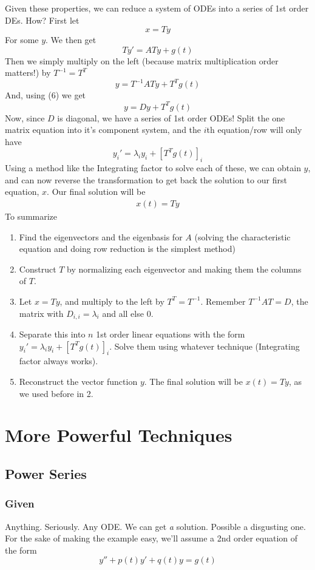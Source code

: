 \documentclass[11pt]{article}
\begin{document}
Given these properties, we can reduce a system of ODEs into a series of 1st order DEs. How? First
let 
    \[ x = Ty \] 
For some $y$. We then get
    \[ Ty' = ATy + g(t) \]
Then we simply multiply on the left (because matrix multiplication order matters!) by $T^{-1} = T^T$
    \[ y = T^{-1}ATy + T^{T}g(t) \]
And, using (6) we get
    \[ y = Dy + T^{T}g(t) \]
Now, since $D$ is diagonal, we have a series of 1st order ODEs! Split the one matrix equation into
it's component system, and the $i$th equation/row will only have 
    \[y_i' = \lambda_i y_i + \left[ T^Tg(t) \right]_i \]  
Using a method like the Integrating factor to solve each of these, we can obtain $y$, and can now reverse
the transformation to get back the solution to our first equation, $x$. Our final solution will be
\begin{align*}
    x(t) = Ty
\end{align*}
To summarize
\begin{enumerate}
    \item Find the eigenvectors and the eigenbasis for $A$ (solving the characteristic equation and doing 
          row reduction is the simplest method)
    \item Construct $T$ by normalizing each eigenvector and making them the columns of $T$.
    \item Let $x = Ty$, and multiply to the left by $T^T = T^{-1}$. Remember $T^{-1}AT = D$, the matrix
          with $D_{i,i} = \lambda_i$ and all else $0$. 
    \item Separate this into $n$ 1st order linear equations with the form 
          $y_i' = \lambda_i y_i + \left[ T^Tg(t) \right]_i $. Solve them using whatever technique (Integrating
          factor always works).
    \item Reconstruct the vector function $y$. The final solution will be $x(t) = Ty$, as we used before
          in 2.
\end{enumerate}
\section{More Powerful Techniques}
\subsection{Power Series}
\subsubsection{Given}
Anything. Seriously. Any ODE. We can get \textit{a} solution. Possible a disgusting one. For the
sake of making the example easy, we'll assume a 2nd order equation of the form
    \[ y'' + p(t)y' + q(t)y = g(t) \] 
\end{document}
